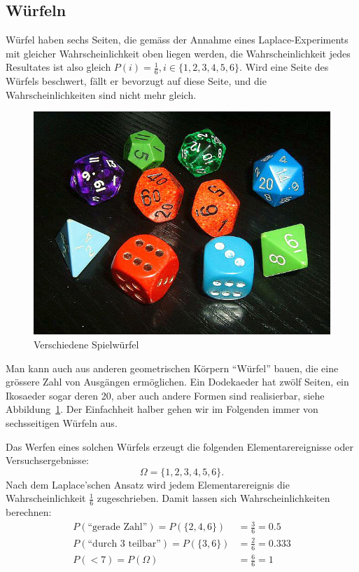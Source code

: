\subsection{Würfeln}
Würfel haben sechs Seiten, die gemäss der Annahme eines Laplace-Experiments
mit gleicher
Wahrscheinlichkeit oben liegen werden, die Wahrscheinlichkeit jedes
Resultates ist also gleich $P(i) = \frac16, i\in\{1,2,3,4,5,6\}$.
Wird eine Seite des Würfels beschwert, fällt er bevorzugt auf diese
Seite, und die Wahrscheinlichkeiten sind nicht mehr gleich.

\begin{figure}
\begin{center}
\includegraphics[width=0.8\hsize]{graphics/Wuerfel5}
\end{center}
\caption{Verschiedene Spielwürfel\label{bild-spielwuerfel}}
\end{figure}
Man kann auch aus anderen geometrischen Körpern ``Würfel'' bauen, die
eine grössere Zahl von Ausgängen ermöglichen.
Ein Dodekaeder hat
zwölf Seiten, ein Ikosaeder sogar deren 20, aber auch andere Formen
sind realisierbar, siehe Abbildung~\ref{bild-spielwuerfel}.
Der Einfachheit
halber gehen wir im Folgenden immer von sechsseitigen Würfeln aus.

Das Werfen eines solchen Würfels erzeugt die folgenden Elementarereignisse
oder Versuchsergebnisse:
\[
\Omega=\{1,2,3,4,5,6\}.
\]
Nach dem Laplace'schen Ansatz wird jedem Elementarereignis die
Wahrscheinlichkeit $\frac16$ zugeschrieben.
Damit lassen sich
Wahrscheinlichkeiten berechnen:
\begin{align*}
P(\text{``gerade Zahl''})=P(\{2,4,6\})&=\frac36=0.5\\
P(\text{``durch 3 teilbar''})=P(\{3,6\})&=\frac26=0.333\\
P(< 7)=P(\Omega)&=\frac66=1
\end{align*}

